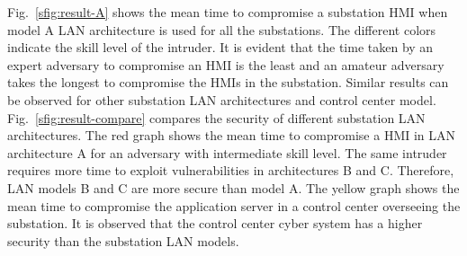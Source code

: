 Fig.~\ref{sfig:result-A} shows the mean time to compromise a substation HMI when model A LAN architecture is used for all the substations. The different colors indicate the skill level of the intruder. It is evident that the time taken by an expert adversary to compromise an HMI is the least and an amateur adversary takes the longest to compromise the HMIs in the substation. Similar results can be observed for other substation LAN architectures and control center model. Fig.~\ref{sfig:result-compare} compares the security of different substation LAN architectures. The red graph shows the mean time to compromise a HMI in LAN architecture A for an adversary with intermediate skill level. The same intruder requires more time to exploit vulnerabilities in architectures B and C. Therefore, LAN models B and C are more secure than model A. The yellow graph shows the mean time to compromise the application server in a control center overseeing the substation. It is observed that the control center cyber system has a higher security than the substation LAN models.

